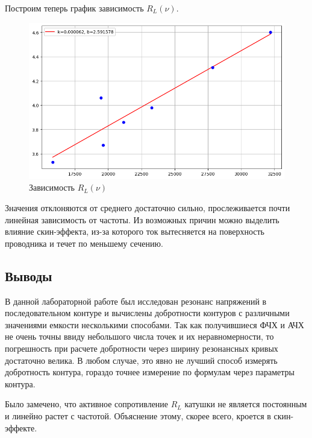\documentclass[a4paper, 12pt]{article}
\begin{document}
	Построим теперь график зависимость $R_L(\nu)$.
	
	\begin{figure}[h]
		\centering
		\includegraphics[width = \textwidth]{images/image copy 3.png}
		\caption{Зависимость $R_L(\nu)$}
	\end{figure}
	
	Значения отклоняются от среднего достаточно сильно, прослеживается почти линейная зависимость от частоты. Из возможных причин можно выделить влияние скин-эффекта, из-за которого ток вытесняется на поверхность проводника и течет по меньшему сечению.
	\newpage
	
	

	\subsection*{Выводы}
	
	В данной лабораторной работе был исследован резонанс напряжений в последовательном контуре и вычислены добротности контуров с различными значениями емкости несколькими способами. Так как получившиеся ФЧХ и АЧХ не очень точны ввиду небольшого числа точек и их неравномерности, то погрешность при расчете добротности через ширину резонансных кривых достаточно велика. В любом случае, это явно не лучший способ измерять добротность контура, гораздо точнее измерение по формулам через параметры контура. 
	
	Было замечено, что активное сопротивление $R_L$ катушки не является постоянным и линейно растет с частотой. Объяснение этому, скорее всего, кроется в скин-эффекте. 
\end{document}
